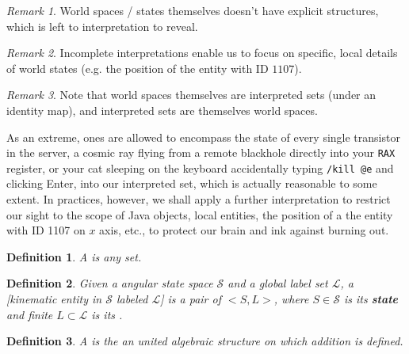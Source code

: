 \documentclass{book}
\newtheorem{definition}{Definition}
\theoremstyle{definition}\newtheorem{mechanism}{Mechanism}
\theoremstyle{remark}\newtheorem*{remark}{Remark}
\begin{document}
\begin{remark}
	World spaces / states themselves doesn't have explicit structures, which is left to interpretation to reveal.
\end{remark}

\begin{remark}
	Incomplete interpretations enable us to focus on specific, local details of world states (e.g. the position of the entity with ID $1107$).
\end{remark}

\begin{remark}
	Note that world spaces themselves are interpreted sets (under an identity map), and interpreted sets are themselves world spaces. 
	
	As an extreme, ones are allowed to encompass the state of every single transistor in the server, a cosmic ray flying from a remote blackhole directly into your \texttt{RAX} register, or your cat sleeping on the keyboard accidentally typing \texttt{/kill @e} and clicking Enter, into our interpreted set, which is actually reasonable to some extent. In practices, however, we shall apply a further interpretation to restrict our sight to the scope of Java objects, local entities, the position of a the entity with ID 1107 on $x$ axis, etc., to protect our brain and ink against burning out.
\end{remark}

\begin{definition}
	A  is any set.
\end{definition}

\begin{definition}
	Given a angular state space $\mathcal S$ and a global label set $\mathcal L$, a [kinematic entity in $\mathcal S$ labeled $\mathcal L$] is a pair of $<S, L>$, where $S\in \mathcal S$ is its {\bf{state}} and finite $L\subset \mathcal L$ is its .
\end{definition}

\begin{definition}
	A  is the an united algebraic structure on which addition is defined.
\end{definition}
\end{document}
